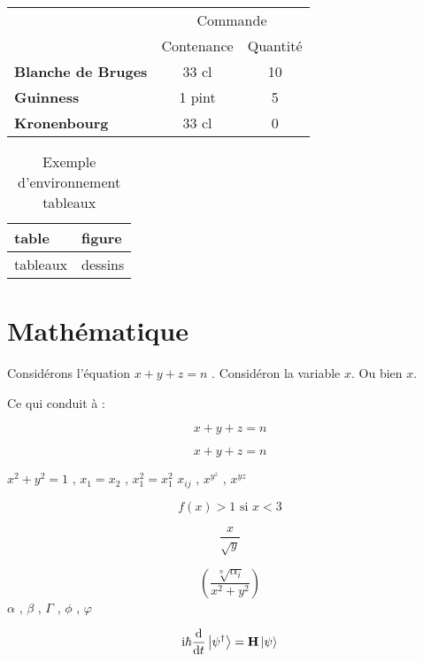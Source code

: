 \documentclass[a4paper,11pt]{article}
\begin{document}
\bigskip

\begin{tabular}{|p{5cm}|*{2}{c|}}
\cline{2-3}
\multicolumn{1}{c|}{}        & \multicolumn{2}{c|}{Commande} \\
\cline{2-3}
\multicolumn{1}{c|}{}        & Contenance & Quantité \\
\hline
\bfseries Blanche de Bruges & 33 cl            & 10          \\
\hline
\bfseries Guinness               & 1 pint           & 5            \\
\hline
\bfseries Kronenbourg         & 33 cl             & 0            \\
\hline
\end{tabular}

\begin{table}[!htbp] %
\centering
\begin{tabular}{|l|l|}
\hline
table      & figure   \\
\hline
tableaux & dessins \\
\hline
\end{tabular}
\caption{Exemple d'environnement tableaux}
\label{tableau/exemple}
\end{table}

\section{Mathématique}
Considérons l'équation \begin{math} x + y + z = n \end{math} .
Considéron la variable $ x $. Ou bien \( x\).

Ce qui conduit à :

\begin{displaymath}
x + y + z = n
\end{displaymath}

\[
x+y+z=n
\]

$ x^2 +y^2=1 $ , $ x_1 = x_2 $ , $ x_1^2=x^2_1 $
$ x_{ij} $ , $ x^{y^z} $ , $ x^{yz} $

\[
f(x) > 1 \mbox{ si } x < 3 %
\]

\[
\frac{x}{\sqrt{y}}
\]

\[
\left (\frac{\sqrt[n]{\alpha_i}}{x^2+y^2}\right )
\]
$ \alpha $ , $\beta $ , $\Gamma$ , $\phi$ , $\varphi$

\[
\mathrm{i}\hbar\frac{\mathrm{d}}{\mathrm{d}t} \ket{\psi^\dagger}= \mathbf{H} \ket{\psi}
\]
\end{document}
